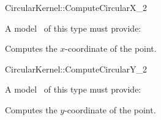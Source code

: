 \begin{ccRefFunctionObjectConcept}{CircularKernel::ComputeCircularX_2}


A model \ccVar\ of this type must provide:

{Computes the $x$-coordinate of the point.}

\end{ccRefFunctionObjectConcept}
\begin{ccRefFunctionObjectConcept}{CircularKernel::ComputeCircularY_2}


A model \ccVar\ of this type must provide:

{Computes the $y$-coordinate of the point.}

\end{ccRefFunctionObjectConcept}
